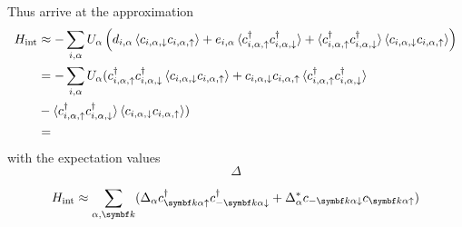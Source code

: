 \documentclass[../notes.tex]{subfiles}
\begin{document}
Thus arrive at the approximation
\begin{align}
	H_{\mathrm{int}} &\approx -\sum_{i, \alpha} U_{\alpha} \left(
	d_{i, \alpha} \braket{c_{i, \alpha, \downarrow} c_{i, \alpha, \uparrow}}
	+ e_{i, \alpha} \braket{c_{i, \alpha, \uparrow}^{\dagger} c_{i, \alpha, \downarrow}^{\dagger}}
	+ \braket{c_{i, \alpha, \uparrow}^{\dagger} c_{i, \alpha, \downarrow}^{\dagger}} \braket{c_{i, \alpha, \downarrow} c_{i, \alpha, \uparrow}}
	\right) \\
	&= -\sum_{i, \alpha} U_{\alpha} (
		c_{i, \alpha, \uparrow}^{\dagger} c_{i, \alpha, \downarrow}^{\dagger} \braket{c_{i, \alpha, \downarrow} c_{i, \alpha, \uparrow}}
		+ c_{i, \alpha, \downarrow} c_{i, \alpha, \uparrow} \braket{c_{i, \alpha, \uparrow}^{\dagger} c_{i, \alpha, \downarrow}^{\dagger}} \\	
	&- \braket{c_{i, \alpha, \uparrow}^{\dagger} c_{i, \alpha, \downarrow}^{\dagger}} \braket{c_{i, \alpha, \downarrow} c_{i, \alpha, \uparrow}} ) \\
	&= 
\end{align}
with the expectation values
\begin{equation}
	\Delta
\end{equation}




\begin{align}
	H_{\mathrm{int}} \approx \sum_{\alpha, \vb{k}} (\Delta_{\alpha} c_{\vb{k} \alpha \uparrow}^{\dagger} c_{-\vb{k} \alpha \downarrow}^{\dagger} + \Delta_{\alpha}^* c_{-\vb{k} \alpha \downarrow} c_{\vb{k} \alpha \uparrow})
\end{align}
\end{document}
